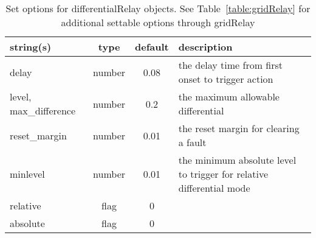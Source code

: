 \begin{table}[ht]
\centering
\begin{tabular}{p{5cm} c c p{7cm}}
\hline
string(s) & type & default & description \\
\hline
delay & number & 0.08 & the delay time from first onset to trigger action\\
level, max\_difference & number & 0.2 & the maximum allowable differential\\
reset\_margin & number & 0.01 & the reset margin for clearing a fault\\
minlevel & number & 0.01 & the minimum absolute level to trigger for relative differential mode\\
relative & flag & 0 & \\
absolute & flag & 0 & \\
\hline
\end{tabular}
\caption{Set options for differentialRelay objects. See Table~\ref{table:gridRelay} for additional settable options through gridRelay}
\label{table:differentialRelay}
\end{table}
